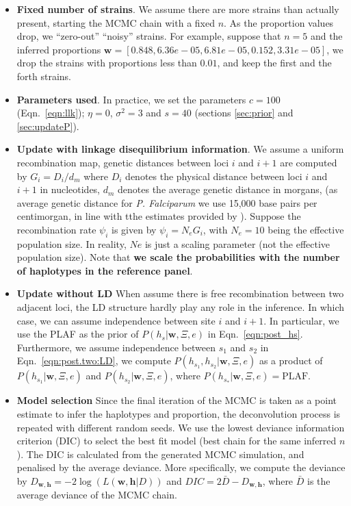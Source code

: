 \documentclass{bioinfo}
\begin{document}
\begin{itemize}
\item {\bf Fixed number of strains}. We assume there are more strains than actually present, starting the MCMC chain with a fixed $n$. As the proportion values drop, we ``zero-out'' ``noisy'' strains. For example, suppose that $n=5$ and the inferred proportions $\mathbf w= [0.848, 6.36e-05, 6.81e-05, 0.152, 3.31e-05]$, we drop the strains with proportions less than $0.01$, and keep the first and the forth strains.

\item {\bf Parameters used}. In practice, we set the parameters $c=100$ (Eqn.~\eqref{eqn:llk}); $\eta = 0$, $\sigma^2 = 3$ and $s=40$ (sections \ref{sec:prior} and \ref{sec:updateP}).

\item {\bf Update with linkage disequilibrium information}. We assume a uniform recombination map, genetic distances between loci $i$ and $i+1$ are computed by $G_i = D_i / d_m$ where $D_i$ denotes the physical distance between loci $i$ and $i+1$ in nucleotides, $d_m$ denotes the average genetic distance in morgans, (as average genetic distance for {\it P. Falciparum} we use 15,000 base pairs per centimorgan, in line with tthe estimates provided by \citet{Miles2016}). Suppose the recombination rate $\psi_i$ is given by $\psi_i = N_e G_i$, with $N_e=10$ being the effective population size. In reality, $Ne$ is just a scaling parameter (not the effective population size). Note that {\bf we scale the probabilities with the number of haplotypes in the reference panel}.

\item {\bf Update without LD} When assume there is free recombination between two adjacent loci, the LD structure hardly play any role in the inference. In which case, we can assume independence between site $i$ and $i+1$. In particular, we use the PLAF as the prior of $P(h_s|\mathbf{w}, \Xi, e)$ in Eqn.~\eqref{eqn:post_hs}. Furthermore, we assume independence between $s_1$ and $s_2$ in Eqn.~\eqref{eqn:post.two:LD}, we compute $P(h_{s_1},h_{s_2}|\mathbf{w},\Xi,e)$ as a product of $P(h_{s_1}|\mathbf{w},\Xi,e)$ and $P(h_{s_2}|\mathbf{w},\Xi,e)$, where $P(h_{s_*}|\mathbf{w}, \Xi, e) = \textrm{PLAF}$.

\item {\bf Model selection} Since the final iteration of the MCMC is taken as a point estimate to infer the haplotypes and proportion, the deconvolution process is repeated with different random seeds. We use the lowest deviance information criterion (DIC) to select the best fit model (best chain for the same inferred $n$). The DIC is calculated from the generated MCMC simulation, and penalised by the average deviance. More specifically, we compute the deviance by $ D_{\mathbf{w}, \mathbf{h}} = -2 \log( L (\mathbf{w}, \mathbf{h}|D) )$ and $DIC = 2\bar{D} - D_{\mathbf{w}, \mathbf{h}}$, where $\bar{D}$ is the average deviance of the MCMC chain.



\end{itemize}
\end{document}
